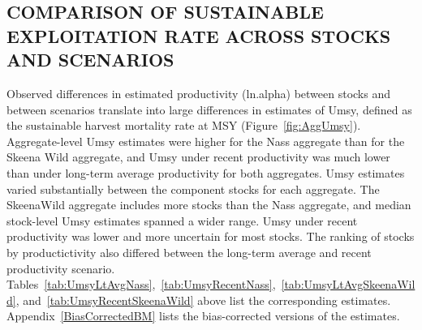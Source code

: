 \documentclass[french,11pt]{book}
\begin{document}
\endgroup{} \endgroup{}

\clearpage

\subsection{COMPARISON OF SUSTAINABLE EXPLOITATION RATE ACROSS STOCKS AND SCENARIOS}\label{UmsyComp}

Observed differences in estimated productivity (ln.alpha) between stocks and between scenarios translate into large differences in estimates of Umsy, defined as the sustainable harvest mortality rate at MSY (Figure~\ref{fig:AggUmsy}). Aggregate-level Umsy estimates were higher for the Nass aggregate than for the Skeena Wild aggregate, and Umsy under recent productivity was much lower than under long-term average productivity for both aggregates. Umsy estimates varied substantially between the component stocks for each aggregate. The SkeenaWild aggregate includes more stocks than the Nass aggregate, and median stock-level Umsy estimates spanned a wider range. Umsy under recent productivity was lower and more uncertain for most stocks. The ranking of stocks by productictivity also differed between the long-term average and recent productivity scenario. Tables~\ref{tab:UmsyLtAvgNass},~\ref{tab:UmsyRecentNass},~\ref{tab:UmsyLtAvgSkeenaWild}, and~\ref{tab:UmsyRecentSkeenaWild} above list the corresponding estimates. Appendix~\ref{BiasCorrectedBM} lists the bias-corrected versions of the estimates.
\end{document}
